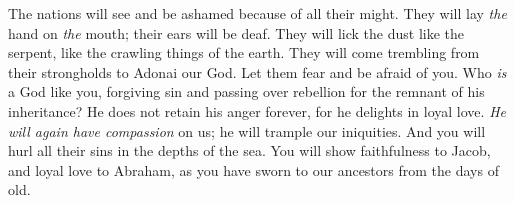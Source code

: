 \begin{biblechapter}
\verse The nations will see and be ashamed 
because of all their might. 
They will lay \textit{the} hand on \textit{the} mouth; 
their ears will be deaf.
\verse They will lick the dust like the serpent, 
like the crawling things of the earth. 
They will come trembling from their strongholds 
to Adonai our God. 
Let them fear and be afraid of you.
\verse Who \textit{is} a God like you, forgiving sin 
and passing over rebellion for the remnant of his inheritance? 
He does not retain his anger forever, 
for he delights in loyal love.
\verse \textit{He will again have compassion} on us; 
he will trample our iniquities. 
And you will hurl all their sins 
in the depths of the sea.
\verse You will show faithfulness to Jacob, 
and loyal love to Abraham, 
as you have sworn to our ancestors 
from the days of old.
\end{biblechapter}

